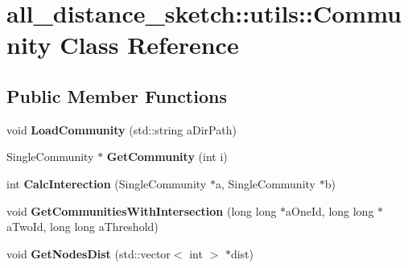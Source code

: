 \hypertarget{classall__distance__sketch_1_1utils_1_1Community}{}\section{all\+\_\+distance\+\_\+sketch\+:\+:utils\+:\+:Community Class Reference}
\label{classall__distance__sketch_1_1utils_1_1Community}
\subsection*{Public Member Functions}
\begin{DoxyCompactItemize}
\item 
\hypertarget{classall__distance__sketch_1_1utils_1_1Community_a3ac9c8b599618d2e52bceadc5c7df9cb}{}void {\bfseries Load\+Community} (std\+::string a\+Dir\+Path)\label{classall__distance__sketch_1_1utils_1_1Community_a3ac9c8b599618d2e52bceadc5c7df9cb}

\item 
\hypertarget{classall__distance__sketch_1_1utils_1_1Community_a8ce5d7801c70ca87ba666a6ead515cd2}{}Single\+Community $\ast$ {\bfseries Get\+Community} (int i)\label{classall__distance__sketch_1_1utils_1_1Community_a8ce5d7801c70ca87ba666a6ead515cd2}

\item 
\hypertarget{classall__distance__sketch_1_1utils_1_1Community_a4f3aa898b0e71c69b569c4093ea39d21}{}int {\bfseries Calc\+Interection} (Single\+Community $\ast$a, Single\+Community $\ast$b)\label{classall__distance__sketch_1_1utils_1_1Community_a4f3aa898b0e71c69b569c4093ea39d21}

\item 
\hypertarget{classall__distance__sketch_1_1utils_1_1Community_a2d7de583cfcf13dce55f31eeb062a721}{}void {\bfseries Get\+Communities\+With\+Intersection} (long long $\ast$a\+One\+Id, long long $\ast$a\+Two\+Id, long long a\+Threshold)\label{classall__distance__sketch_1_1utils_1_1Community_a2d7de583cfcf13dce55f31eeb062a721}

\item 
\hypertarget{classall__distance__sketch_1_1utils_1_1Community_acbb8e1e7ab6c16b08da460145ab64d83}{}void {\bfseries Get\+Nodes\+Dist} (std\+::vector$<$ int $>$ $\ast$dist)\label{classall__distance__sketch_1_1utils_1_1Community_acbb8e1e7ab6c16b08da460145ab64d83}

\end{DoxyCompactItemize}
